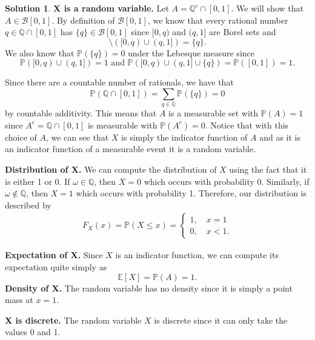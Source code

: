 \documentclass[12pt]{article}
\newcommand{\bbQ}{\mathbb{Q}}
\newcommand{\Prob}{\mathbb{P}}
\newcommand{\Expect}[1]{\mathbb{E}\left[#1 \right]}
\theoremstyle{definition}
\newtheorem{sol}{Solution}
\theoremstyle{remark}
\begin{document}
\begin{sol}\leavevmode
    
 \textbf{X is a random variable. }%
    Let $A = \bbQ^c \cap [0,1]$. We will show that $A\in \mathcal{B}[0,1]$. By definition of $\mathcal{B}[0,1]$, we know that every rational number $q\in \bbQ\cap[0,1]$ has $\{ q\} \in \mathcal{B}[0,1]$ since $[0, q)$ and $(q,1]$ are Borel sets and
    \begin{equation}
        [0,1] \setminus ([0,q) \cup (q,1]) = \{q \}.
    \end{equation} We also know that $\Prob(\{q\}) = 0$ under the Lebesque measure since 
    \begin{equation}
        \Prob([0,q) \cup (q,1]) = 1 \text{ and } \Prob( [0,q ) \cup (q,1] \cup \{q \}) = \Prob( [0,1]) = 1.
    \end{equation}

    Since there are a countable number of rationals, we have that
    \begin{equation}
        \Prob( \bbQ \cap [0,1] ) = \sum_{q \in \bbQ} \Prob(\{ q\}) = 0
    \end{equation}
    by countable additivity. This means that $A$ is a measurable set with $\Prob(A) = 1$ since $A^c = \bbQ \cap [0,1]$ is measurable with $\Prob(A^c) = 0$. Notice that with this choice of $A$, we can see that $X$ is simply the indicator function of $A$ and as it is an indicator function of a measurable event it is a random variable. 

\textbf{Distribution of X. }%
We can compute the distribution of $X$ using the fact that it is either 1 or 0. If $\omega \in \bbQ$, then $X = 0$ which occurs with probability 0. Similarly, if $\omega\notin\bbQ$, then $X=1$ which occurs with probability 1. Therefore, our distribution is described by
\begin{align}
    F_X(x) = \Prob(X \leq x) = \begin{cases}
        1, \quad x=1\\
        0, \quad x<1.
    \end{cases}
\end{align}

\textbf{Expectation of X.}
Since $X$ is an indicator function, we can compute its expectation quite simply as
\begin{equation}
    \Expect X = \Prob(A) = 1.
\end{equation}
\textbf{Density of X.} 
The random variable has no density since it is simply a point mass at $x=1$.

\textbf{X is discrete.} The random variable $X$ is discrete since it can only take the values 0 and 1.
\end{sol}
\end{document}
